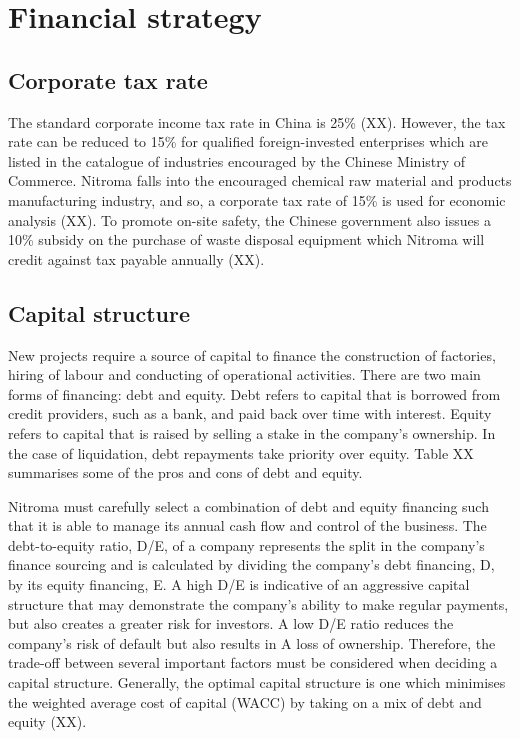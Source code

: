 \section{Financial strategy}
\subsection{Corporate tax rate}
The standard corporate income tax rate in China is 25\% (XX). However, the tax rate can be reduced to 15\% for qualified foreign-invested enterprises which are listed in the catalogue of industries encouraged by the Chinese Ministry of Commerce. Nitroma falls into the encouraged chemical raw material and products manufacturing industry, and so, a corporate tax rate of 15\% is used for economic analysis (XX). To promote on-site safety, the Chinese government also issues a 10\% subsidy on the purchase of waste disposal equipment which Nitroma will credit against tax payable annually (XX).

\subsection{Capital structure}
New projects require a source of capital to finance the construction of factories, hiring of labour and conducting of operational activities. There are two main forms of financing: debt and equity. Debt refers to capital that is borrowed from credit providers, such as a bank, and paid back over time with interest. Equity refers to capital that is raised by selling a stake in the company’s ownership. In the case of liquidation, debt repayments take priority over equity. Table XX summarises some of the pros and cons of debt and equity.

Nitroma must carefully select a combination of debt and equity financing such that it is able to manage its annual cash flow and control of the business. The debt-to-equity ratio, D/E, of a company represents the split in the company’s finance sourcing and is calculated by dividing the company’s debt financing, D, by its equity financing, E. A high D/E is indicative of an aggressive capital structure that may demonstrate the company’s ability to make regular payments, but also creates a greater risk for investors. A low D/E ratio reduces the company’s risk of default but also results in A loss of ownership. Therefore, the trade-off between several important factors must be considered when deciding a capital structure. Generally, the optimal capital structure is one which minimises the weighted average cost of capital (WACC) by taking on a mix of debt and equity (XX).


